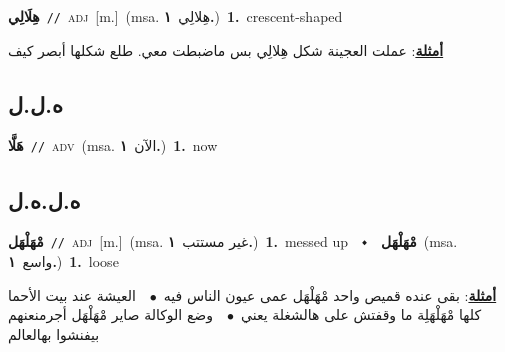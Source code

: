 \documentclass[10pt,a4paper,twoside]{article} %
\begin{document}
\begin{multicols}{2}
{\setlength\topsep{0pt}\textbf{\foreignlanguage{arabic}{هِلَالِي}}\ {\color{gray}\texttt{//}\color{black}}\ \textsc{adj}\ [m.]\ \color{gray}(msa. \foreignlanguage{arabic}{هِلالِي}~\foreignlanguage{arabic}{\textbf{١.}})\color{black}\ \textbf{1.}~crescent-shaped\  \begin{flushright}\color{gray}\foreignlanguage{arabic}{\textbf{\underline{\foreignlanguage{arabic}{أمثلة}}}: عملت العجينة شكل هِلالِي بس ماضبطت معي. طلع شكلها أبصر كيف}\end{flushright}\color{black}} \vspace{2mm}

\vspace{-3mm}
\subsection*{\color{blue}\foreignlanguage{arabic}{ه.ل.ل}\color{blue}{ (ntws)}} 

{\setlength\topsep{0pt}\textbf{\foreignlanguage{arabic}{هَلَّا}}\ {\color{gray}\texttt{//}\color{black}}\ \textsc{adv}\ \color{gray}(msa. \foreignlanguage{arabic}{الآن}~\foreignlanguage{arabic}{\textbf{١.}})\color{black}\ \textbf{1.}~now\ } \vspace{2mm}

\vspace{-3mm}
\subsection*{\color{blue}\foreignlanguage{arabic}{ه.ل.ه.ل}\color{blue}{}} 

{\setlength\topsep{0pt}\textbf{\foreignlanguage{arabic}{مْهَلْهَل}}\ {\color{gray}\texttt{//}\color{black}}\ \textsc{adj}\ [m.]\ \color{gray}(msa. \foreignlanguage{arabic}{غير مستتب}~\foreignlanguage{arabic}{\textbf{١.}})\color{black}\ \textbf{1.}~messed up\ \ $\smblkdiamond$\ \ \setlength\topsep{0pt}\textbf{\foreignlanguage{arabic}{مْهَلْهَل}}\ \color{gray}(msa. \foreignlanguage{arabic}{واسع}~\foreignlanguage{arabic}{\textbf{١.}})\color{black}\ \textbf{1.}~loose\  \begin{flushright}\color{gray}\foreignlanguage{arabic}{\textbf{\underline{\foreignlanguage{arabic}{أمثلة}}}: بقى عنده قميص واحد مْهَلْهَل عمى عيون الناس فيه\ $\bullet$\ \  العيشة عند بيت الأحما كلها مْهَلْهَلِة ما وقفتش على هالشغلة يعني\ $\bullet$\ \  وضع الوكالة صاير مْهَلْهَل أجرمنعنهم بيفنشوا بهالعالم}\end{flushright}\color{black}} \vspace{2mm}


\end{multicols}
\end{document}
